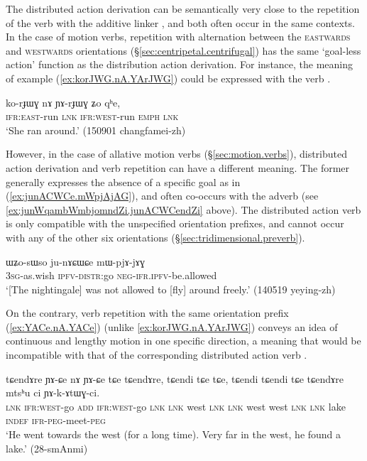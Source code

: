 The distributed action derivation can be semantically very close to the repetition of the verb with the additive linker , and both often occur in the same contexts. In the case of motion verbs, repetition with alternation between the \textsc{eastwards} and \textsc{westwards} orientations (§\ref{sec:centripetal.centrifugal}) has the same `goal-less action' function as the distribution action derivation. For instance, the meaning of example (\ref{ex:korJWG.nA.YArJWG}) could be expressed with the verb .

\begin{exe}
\ex \label{ex:korJWG.nA.YArJWG}
\gll ko-rɟɯɣ nɤ ɲɤ-rɟɯɣ ʑo qʰe, \\
\textsc{ifr}:\textsc{east}-run \textsc{lnk} \textsc{ifr}:\textsc{west}-run \textsc{emph} \textsc{lnk}  \\
\glt `She ran around.' (150901 changfamei-zh)
\end{exe}

However, in the case of allative motion verbs (§\ref{sec:motion.verbs}), distributed action derivation and verb repetition can have a different meaning. The former generally expresses the absence of a specific goal as in (\ref{ex:junACWCe.mWpjAjAG}), and often co-occurs with the adverb  (see \ref{ex:junWqambWmbjomndZi.junACWCendZi} above). The distributed action verb  is only compatible with the unspecified orientation prefixes, and cannot occur with any of the other six orientations (§\ref{sec:tridimensional.preverb}).

\begin{exe}
\ex \label{ex:junACWCe.mWpjAjAG}
\gll ɯʑo-sɯso ju-nɤɕɯɕe mɯ-pjɤ-jɤɣ \\
\textsc{3sg}-as.wish \textsc{ipfv}-\textsc{distr}:go \textsc{neg}-\textsc{ifr}.\textsc{ipfv}-be.allowed \\
\glt `[The nightingale] was not allowed to [fly] around freely.' (140519 yeying-zh) 
\end{exe}


On the contrary, verb repetition with the same orientation prefix (\ref{ex:YACe.nA.YACe}) (unlike \ref{ex:korJWG.nA.YArJWG}) conveys an idea of continuous and lengthy motion in one specific direction, a meaning that would be incompatible with that of the corresponding distributed action verb .

\begin{exe}
\ex \label{ex:YACe.nA.YACe}
\gll tɕendɤre ɲɤ-ɕe nɤ ɲɤ-ɕe tɕe tɕendɤre, tɕendi tɕe tɕe, tɕendi tɕendi tɕe tɕendɤre mtsʰu ci ɲɤ-k-ɤtɯɣ-ci. \\
\textsc{lnk} \textsc{ifr}:\textsc{west}-go \textsc{add} \textsc{ifr}:\textsc{west}-go \textsc{lnk} \textsc{lnk} west \textsc{lnk} \textsc{lnk} west west \textsc{lnk} \textsc{lnk} lake \textsc{indef} \textsc{ifr}-\textsc{peg}-meet-\textsc{peg} \\
\glt `He went towards the west (for a long time). Very far in the west, he found a lake.' (28-smAnmi) 
\end{exe}

